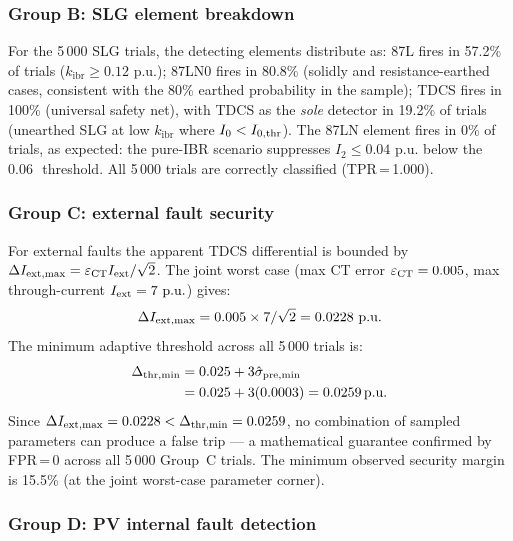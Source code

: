 \documentclass[journal,twoside,10pt]{IEEEtran}
\newcommand{\kibr}{k_{\mathrm{ibr}}}
\newcommand{\pu}{\,\text{p.u.}}
\begin{document}
\subsubsection{Group B: SLG element breakdown}

For the 5\,000 SLG trials, the detecting elements distribute as:
87L fires in 57.2\% of trials ($\kibr \geq 0.12\,\pu$);
87LN0 fires in 80.8\% (solidly and resistance-earthed cases,
consistent with the 80\% earthed probability in the sample);
TDCS fires in 100\% (universal safety net), with TDCS as the \emph{sole}
detector in 19.2\% of trials (unearthed SLG at low $\kibr$ where
$I_0 < I_{0,\rm thr}$).
The 87LN element fires in 0\% of trials, as expected: the
pure-IBR scenario suppresses $I_2 \leq 0.04\,\pu$ below the 0.06\,\pu
threshold.
All 5\,000 trials are correctly classified (TPR\,=\,1.000).

\subsubsection{Group C: external fault security}

For external faults the apparent TDCS differential is bounded by
$\Delta I_{\rm ext,max} = \varepsilon_{\rm CT} I_{\rm ext}/\sqrt{2}$.
The joint worst case (max CT error $\varepsilon_{\rm CT} = 0.005$,
max through-current $I_{\rm ext} = 7\,\pu$) gives:
\begin{equation}
  \Delta I_{\rm ext,max} = 0.005 \times 7/\sqrt{2} = 0.0228\,\pu
  \label{eq:ext_worst}
\end{equation}
The minimum adaptive threshold across all 5\,000 trials is:
\begin{equation}
  \begin{split}
  \Delta_{\rm thr,min} &= 0.025 + 3\hat{\sigma}_{\rm pre,min} \\
                       &= 0.025 + 3{(0.0003)} = 0.0259\pu
  \end{split}
  \label{eq:thr_min_mc}
\end{equation}
Since $\Delta I_{\rm ext,max} = 0.0228 < \Delta_{\rm thr,min} = 0.0259$,
no combination of sampled parameters can produce a false trip ---
a mathematical guarantee confirmed by FPR\,=\,0 across all 5\,000
Group~C trials.  The minimum observed security margin is 15.5\%
(at the joint worst-case parameter corner).

\subsubsection{Group D: PV internal fault detection}
\end{document}
